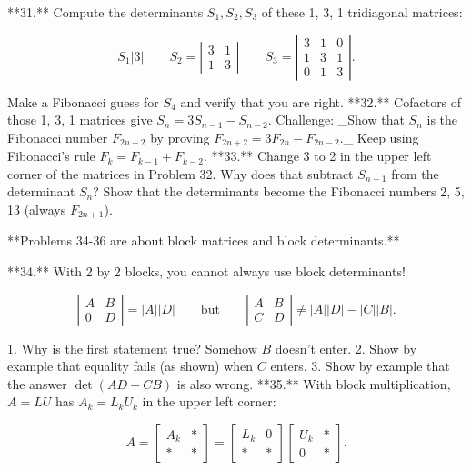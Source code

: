 

**31.** Compute the determinants \(S_{1},S_{2},S_{3}\) of these 1, 3, 1 tridiagonal matrices:

\[S_{1}\left|3\right|\qquad S_{2}=\left|\begin{matrix}3&1\\ 1&3\end{matrix}\right|\qquad S_{3}=\left|\begin{matrix}3&1&0\\ 1&3&1\\ 0&1&3\end{matrix}\right|.\]

Make a Fibonacci guess for \(S_{4}\) and verify that you are right.
**32.** Cofactors of those 1, 3, 1 matrices give \(S_{n}=3S_{n-1}-S_{n-2}\). Challenge: _Show that \(S_{n}\) is the Fibonacci number \(F_{2n+2}\) by proving \(F_{2n+2}=3F_{2n}-F_{2n-2}\)._ Keep using Fibonacci's rule \(F_{k}=F_{k-1}+F_{k-2}\).
**33.** Change 3 to 2 in the upper left corner of the matrices in Problem 32. Why does that subtract \(S_{n-1}\) from the determinant \(S_{n}\)? Show that the determinants become the Fibonacci numbers 2, 5, 13 (always \(F_{2n+1}\)).

**Problems 34-36 are about block matrices and block determinants.**

**34.** With 2 by 2 blocks, you cannot always use block determinants!

\[\left|\begin{matrix}A&B\\ 0&D\end{matrix}\right|=|A||D|\qquad\text{but}\qquad\left|\begin{matrix}A&B\\ C&D\end{matrix}\right|\neq|A||D|-|C||B|.\]

1. Why is the first statement true? Somehow \(B\) doesn't enter.
2. Show by example that equality fails (as shown) when \(C\) enters.
3. Show by example that the answer \(\det(AD-CB)\) is also wrong.
**35.** With block multiplication, \(A=LU\) has \(A_{k}=L_{k}U_{k}\) in the upper left corner:

\[A=\left[\begin{matrix}A_{k}&*\\ *&*\end{matrix}\right]=\left[\begin{matrix}L_{k}&0\\ *&*\end{matrix}\right]\left[\begin{matrix}U_{k}&*\\ 0&*\end{matrix}\right].\]

